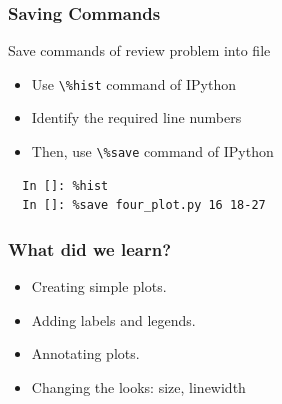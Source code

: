 \documentclass[14pt,compress]{beamer}
\newcommand{\typ}[1]{\lstinline{#1}}
\begin{document}
\begin{frame}[fragile]
\frametitle{Saving Commands}
Save commands of review problem into file
\begin{itemize}
\item Use \typ{\%hist} command of IPython 
\item Identify the required line numbers
\item Then, use \typ{\%save} command of IPython
\end{itemize}
\begin{lstlisting}
  In []: %hist
  In []: %save four_plot.py 16 18-27
\end{lstlisting}
\end{frame}

\begin{frame}
  \frametitle{What did we learn?}
  \begin{itemize}
    \item Creating simple plots.
    \item Adding labels and legends.
    \item Annotating plots.
    \item Changing the looks: size, linewidth
  \end{itemize}
\end{frame}
\end{document}
